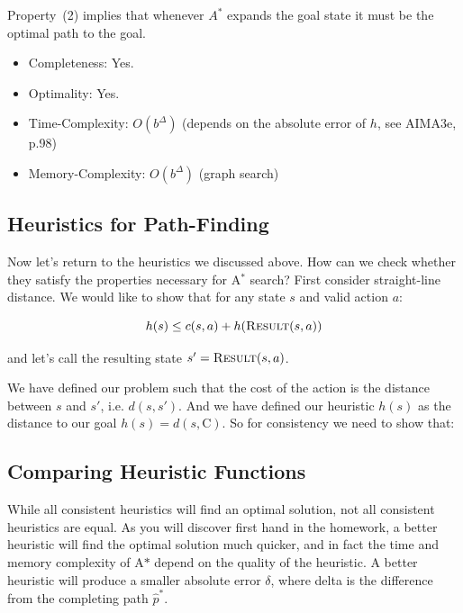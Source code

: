 \documentclass[11pt]{article}
\begin{document}
\noindent Property~(2) implies that whenever $A^*$ expands the goal state it must be the optimal path to the goal.

\begin{itemize}
\item Completeness: Yes.  
\item Optimality: Yes. 
\item Time-Complexity: $O(b^\Delta)$ (depends on the absolute error of $h$, see AIMA3e, p.98)
\item Memory-Complexity: $O(b^\Delta)$ (graph search)
\end{itemize}


\subsection{Heuristics for Path-Finding}

Now let's return to the heuristics we discussed above. How can we check whether they satisfy the properties necessary for A$^*$ search? First consider straight-line distance. We would like to show that for any state $s$ and valid action $a$:

\[h(s) \leq c(s, a) + h(\mathrm{\textsc{Result}}(s, a))\]

\noindent and let's call the resulting state $s' = \mathrm{\textsc{Result}}(s, a)$.

We have defined our problem such that the cost of the action is the distance between $s$ and $s'$, i.e. $d(s, s')$. And we have defined our heuristic $h(s)$ as the distance to our goal $h(s) = d(s, \mathrm{C})$. So for consistency we need to show that: 




\subsection{Comparing Heuristic Functions}

While all consistent heuristics will find an optimal solution, not all
consistent heuristics are equal. As you will discover first hand in
the homework, a better heuristic will find the optimal solution much
quicker, and in fact the time and memory complexity of A$*$ depend on 
the quality of the heuristic. A better heuristic will produce a smaller
absolute error $\delta$, where delta is the difference from the completing 
path $\hat{p}^*$.
\end{document}
